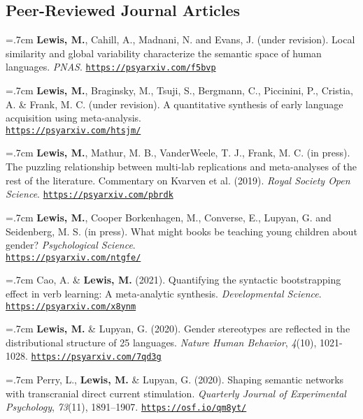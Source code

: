 \documentclass[letterpaper]{article}
\begin{document}
\subsection*{Peer-Reviewed Journal Articles}

\onehalfspacing



\hangindent=.7cm {\bf Lewis, M.}, Cahill, A., Madnani, N. and Evans, J.  (under revision). Local similarity and global variability characterize the semantic space of human languages.   {\it PNAS}. \href{https://psyarxiv.com/f5bvp}{\tt https://psyarxiv.com/f5bvp}



\hangindent=.7cm {\bf Lewis, M.}, Braginsky, M., Tsuji, S., Bergmann, C., Piccinini, P., Cristia, A. \& Frank, M. C. (under revision). A quantitative synthesis of early language acquisition using meta-analysis. \\ \href{https://psyarxiv.com/htsjm/}{\tt  https://psyarxiv.com/htsjm/}



\hangindent=.7cm {\bf Lewis, M.}, Mathur, M. B., VanderWeele, T. J., Frank, M. C. (in press). The puzzling relationship between multi-lab replications and meta-analyses of the rest of the literature. Commentary on Kvarven et al. (2019).  {\it Royal Society Open Science}. \href{https://psyarxiv.com/pbrdk}{\tt https://psyarxiv.com/pbrdk}



\hangindent=.7cm {\bf Lewis, M.}, Cooper Borkenhagen, M., Converse, E., Lupyan, G. and Seidenberg, M. S. (in press). What might books be teaching young children about gender? {\it Psychological Science}. \\ \href{https://psyarxiv.com/ntgfe/}{\tt https://psyarxiv.com/ntgfe/}

\hangindent=.7cm Cao, A. \& {\bf Lewis, M.} (2021). Quantifying the syntactic bootstrapping effect in verb learning: A meta-analytic synthesis.  {\it Developmental Science}. \href{https://psyarxiv.com/x8ynm}{\tt https://psyarxiv.com/x8ynm}


\hangindent=.7cm {\bf Lewis, M.} \& Lupyan, G. (2020). Gender stereotypes are reflected in the distributional structure of 25 languages.  {\it Nature Human Behavior}, {\it 4}(10), 1021-1028. \href{https://psyarxiv.com/7qd3g}{\tt https://psyarxiv.com/7qd3g}

\hangindent=.7cm Perry, L., {\bf Lewis, M.} \& Lupyan, G. (2020). Shaping semantic networks with transcranial direct current stimulation. {\it Quarterly Journal of Experimental Psychology},  {\it 73}(11), 1891–1907. \href{https://osf.io/qm8yt/}{\tt https://osf.io/qm8yt/}
\end{document}
